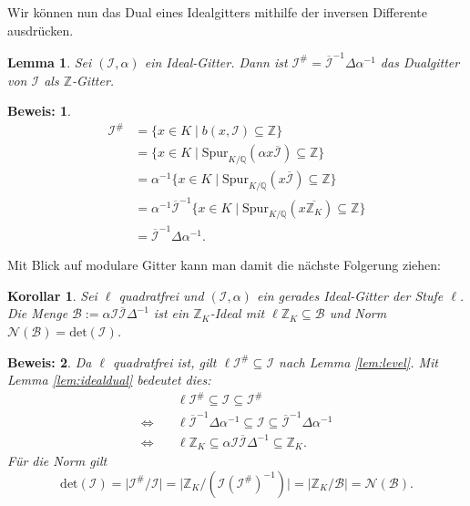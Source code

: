 \documentclass[12pt,a4paper,halfparskip,headsepline,bibtotocnumbered]{scrreprt}
\theoremstyle{nummermitklammern}
\newtheorem{lemma}[defsatzusw]{Lemma}
\newtheorem{korollar}[defsatzusw]{Korollar}
\theoremstyle{nonumberbreak}
\newtheorem{beweis}{Beweis:}
\newcommand{\Z}{\mathbb{Z}}
\newcommand{\Q}{\mathbb{Q}}
\newcommand{\B}{\mathcal{B}}
\newcommand{\No}{\mathcal{N}}
\newcommand{\I}{\mathcal{I}}
\begin{document}
Wir können nun das Dual eines Idealgitters mithilfe der inversen Differente ausdrücken.

\begin{framed}
	\begin{lemma}\label{lem:idealdual}
		Sei $(\I, \alpha)$ ein Ideal-Gitter. Dann ist $\I^\# = \overline{\I}^{-1} \Delta \alpha^{-1}$ das Dualgitter von $\I$ als $\Z$-Gitter.
	\end{lemma}
\end{framed}

\begin{beweis}
	\begin{align*}
	\I^\# &= \lbrace x \in K \mid b(x,\I) \subseteq \Z \rbrace\\
	&= \lbrace x \in K \mid \text{Spur}_{K/\Q}(\alpha x \overline{\I}) \subseteq \Z \rbrace\\
	&= \alpha^{-1} \lbrace x \in K \mid \text{Spur}_{K/\Q}(x \overline{\I}) \subseteq \Z\rbrace\\
	&= \alpha^{-1} \overline{\I}^{-1} \lbrace x \in K \mid \text{Spur}_{K/\Q}(x \overline{\Z_K}) \subseteq \Z\rbrace\\
	&= \overline{\I}^{-1} \Delta \alpha^{-1}.
	\end{align*}
\end{beweis}

Mit Blick auf modulare Gitter kann man damit die nächste Folgerung ziehen:

\begin{framed}
	\begin{korollar}
		Sei $\ell$ quadratfrei und $(\I, \alpha)$ ein gerades Ideal-Gitter der Stufe $\ell$. Die Menge $\B := \alpha \I \overline{\I} \Delta^{-1}$ ist ein $\Z_K$-Ideal mit $\ell \Z_K \subseteq \B$ und Norm $\No(\B) = \text{det}(\I)$.
	\end{korollar}
\end{framed}

\begin{beweis}
	Da $\ell$ quadratfrei ist, gilt $\ell \I^\# \subseteq \I$ nach Lemma \eqref{lem:level}. Mit Lemma \eqref{lem:idealdual} bedeutet dies:
	\begin{align*}
		&\ell \I^\# \subseteq \I \subseteq \I^\#\\
		\Leftrightarrow\quad& \ell \overline{\I}^{-1} \Delta \alpha^{-1} \subseteq \I \subseteq \overline{\I}^{-1} \Delta \alpha^{-1}\\
		\Leftrightarrow\quad& \ell \Z_K \subseteq \alpha \I \overline{\I} \Delta^{-1} \subseteq \Z_K.
	\end{align*}
	Für die Norm gilt
	\begin{equation*}
		\text{det}(\I) = \vert \I^\# / \I \vert = \vert \Z_K / \left(\I\left(\I^\#\right)^{-1}\right) \vert = \vert \Z_K / \B \vert = \No(\B).
	\end{equation*}
\end{beweis}
\end{document}
